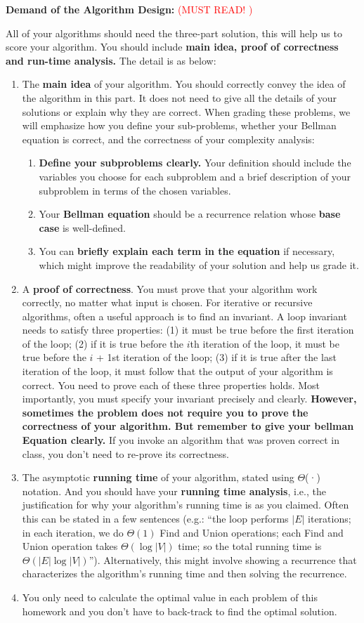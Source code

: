 {\large\textbf{Demand of the Algorithm Design:}} \textcolor{red}{(MUST READ! )}

All of your algorithms should need the three-part solution, this will help us to score your algorithm. You should include {\large\textbf{main idea,  proof of correctness and run-time analysis.}} The detail is as below:
\begin{enumerate}
\item The {\textbf{main idea}} of your algorithm. You should correctly convey the idea of the algorithm in this part. It does not need to give all the details of your solutions or explain why they are correct. When grading these problems, we will emphasize how you define your sub-problems, whether your Bellman equation is correct, and the correctness of your complexity analysis:
    \begin{enumerate}
        \item \textbf{Define your subproblems clearly.} Your definition should include the variables you choose for each subproblem and a brief description of your subproblem in terms of the chosen variables. 
        \item Your \textbf{Bellman equation} should be a recurrence relation whose \textbf{base case} is well-defined.
        \item You can \textbf{briefly explain each term in the equation} if necessary, which might improve the readability of your solution and help us grade it.
    \end{enumerate}
\item A {\textbf{proof of correctness}}.  You must prove that your algorithm work correctly, no matter what input is chosen. For iterative or recursive algorithms, often a useful approach is to find an invariant. A loop invariant needs to satisfy three properties: (1) it must be true before the first iteration of the loop; (2) if it is true before the $i$th iteration of the loop, it must be true before the $i$ + 1st iteration of the loop; (3) if it is true after the last iteration of the loop, it must follow that the output of your algorithm is correct. You need to prove each of these three properties holds. Most importantly, you must specify your invariant precisely and clearly. \textbf{However, sometimes the problem does not require you to prove the correctness of your algorithm. But remember to give your bellman Equation clearly.}
If you invoke an algorithm that was proven correct in class, you don’t need to re-prove its correctness.
\item The asymptotic \textbf{running time} of your algorithm, stated using $\Theta$(·) notation. And you should have your \textbf{running time analysis}, i.e., the justification for why your algorithm’s running time is as you claimed. Often this can be stated in a few sentences (e.g.: “the loop performs $|E|$ iterations; in each iteration, we do $\Theta(1)$ Find and Union operations; each Find and Union operation takes $\Theta(\log|V|)$ time; so the total running time is $\Theta(|E|\log|V|)$”). Alternatively, this might involve showing a recurrence that characterizes the algorithm’s running time and then solving the recurrence.

\item You only need to calculate the optimal value in each problem of this homework and you don’t have to back-track to find the optimal solution.
\end{enumerate}